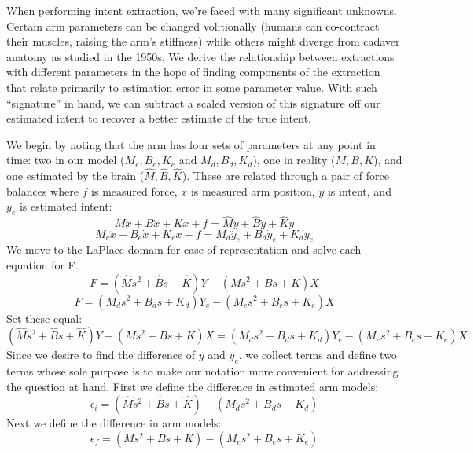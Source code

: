 \documentclass[10pt]{article}
\begin{document}
When performing intent extraction, we're faced with many significant unknowns. Certain arm parameters can be changed volitionally (humans can co-contract their muscles, raising the arm's stiffness) while others might diverge from cadaver anatomy as studied in the 1950s. We derive the relationship between extractions with different parameters in the hope of finding components of the extraction that relate primarily to estimation error in some parameter value. With such ``signature'' in hand, we can subtract a scaled version of this signature off our estimated intent to recover a better estimate of the true intent.

We begin by noting that the arm has four sets of parameters at any point in time: two in our model ($M_e, B_e, K_e$ and $M_d, B_d, K_d$), one in reality ($M, B, K$), and one estimated by the brain ($\hat{M}, \hat{B}, \hat{K}$). These are related through a pair of force balances where $f$ is measured force, $x$ is measured arm position, $y$ is intent, and $y_e$ is estimated intent:
\begin{equation}
M\ddot{x}+B\dot{x}+Kx+f=\hat{M}\ddot{y}+\hat{B}\dot{y}+\hat{K}y
\end{equation}
\begin{equation}
M_e\ddot{x}+B_e\dot{x}+K_ex+f=M_d\ddot{y}_e+B_d\dot{y}_e+K_dy_e
\end{equation}
We move to the LaPlace domain for ease of representation and solve each equation for F.
\begin{equation}
F=(\hat{M}s^2+\hat{B}s+\hat{K})Y-(Ms^2+Bs+K)X
\end{equation}
\begin{equation}
F=(M_ds^2+B_ds+K_d)Y_e-(M_es^2+B_es+K_e)X
\end{equation}
Set these equal:
\begin{equation}
(\hat{M}s^2+\hat{B}s+\hat{K})Y-(Ms^2+Bs+K)X=(M_ds^2+B_ds+K_d)Y_e-(M_es^2+B_es+K_e)X
\end{equation}
Since we desire to find the difference of $y$ and $y_e$, we collect terms and define two terms whose sole purpose is to make our notation more convenient for addressing the question at hand. First we define the difference in estimated arm models:
\begin{equation}
\epsilon_i=(\hat{M}s^2+\hat{B}s+\hat{K})-(M_ds^2+B_ds+K_d)
\end{equation}
Next we define the difference in arm models:
\begin{equation}
\epsilon_f=(Ms^2+Bs+K)-(M_es^2+B_es+K_e)
\end{equation}
\end{document}
